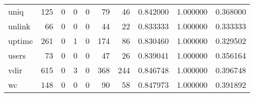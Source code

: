 \begin{longtable}{lrrrrrrrrr}
uniq      &                                   125 &                                                  0 &                                                  0 &                                                  0 &                                                 79 &                                                 46 &                                           0.842000 &                               1.000000 &                             0.368000 \\
unlink    &                                    66 &                                                  0 &                                                  0 &                                                  0 &                                                 44 &                                                 22 &                                           0.833333 &                               1.000000 &                             0.333333 \\
uptime    &                                   261 &                                                  0 &                                                  1 &                                                  0 &                                                174 &                                                 86 &                                           0.830460 &                               1.000000 &                             0.329502 \\
users     &                                    73 &                                                  0 &                                                  0 &                                                  0 &                                                 47 &                                                 26 &                                           0.839041 &                               1.000000 &                             0.356164 \\
vdir      &                                   615 &                                                  0 &                                                  3 &                                                  0 &                                                368 &                                                244 &                                           0.846748 &                               1.000000 &                             0.396748 \\
wc        &                                   148 &                                                  0 &                                                  0 &                                                  0 &                                                 90 &                                                 58 &                                           0.847973 &                               1.000000 &                             0.391892 \\

\end{longtable}

